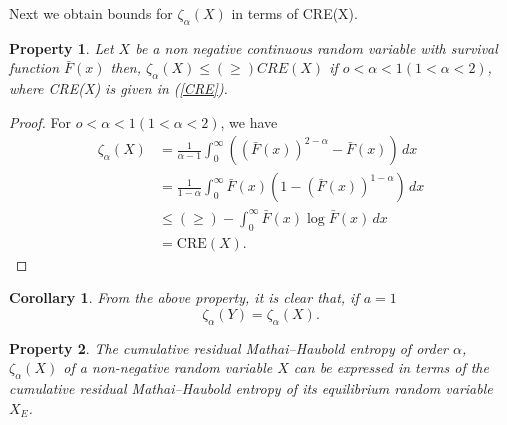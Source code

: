 \documentclass[11pt,reqno]{amsart}
\theoremstyle{tight}
\newtheorem{corollary}{Corollary}[section]
\newtheorem{property}{Property}[section]
\begin{document}
Next we obtain bounds for $\zeta_{\alpha}(X)$ in terms of CRE(X).
\begin{property}
    Let $X$ be a non negative continuous random variable with survival function $\bar{F}(x)$ then, $\zeta_{\alpha}(X)\leq(\geq)CRE(X)$  if $o<\alpha<1(1<\alpha<2)$, where CRE(X) is given in (\ref{CRE}).
\end{property}
\begin{proof}
For $o<\alpha<1(1<\alpha<2)$, we have\\

 \begin{align}
\zeta_{\alpha}(X)
&= \frac{1}{\alpha-1}
\int_0^\infty
\left( (\bar{F}(x))^{2-\alpha}
- \bar{F}(x) \right)\,dx \nonumber\\
&= \frac{1}{1-\alpha}
\int_0^\infty
\bar{F}(x)
\left( 1 - (\bar{F}(x))^{1-\alpha} \right)\,dx \nonumber\\
&\leq(\geq)-\int_{0}^{\infty}
\bar{F}(x)\log \bar{F}(x)\,dx \nonumber\\
&= \mathrm{CRE}(X).
\end{align}




\end{proof}
\begin{corollary}
From the above property, it is clear that, if $a=1$
\[
\zeta_{\alpha}(Y)=\zeta_{\alpha}(X).
\]
\end{corollary}
\begin{property}
The cumulative residual Mathai--Haubold entropy of order $\alpha$, $\zeta_{\alpha}(X)$ of a non-negative random variable $X$ can be expressed in terms of the cumulative residual Mathai--Haubold entropy of its equilibrium random variable $X_E$.
\end{property}
\end{document}
